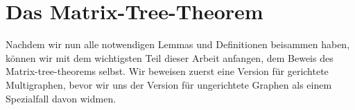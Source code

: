\graphicspath{{grafiken/}}

\section{Das Matrix-Tree-Theorem}

Nachdem wir nun alle notwendigen Lemmas und Definitionen beisammen haben, können wir mit dem wichtigsten Teil dieser Arbeit anfangen, dem Beweis des Matrix-tree-theorems selbst. Wir beweisen zuerst eine Version für gerichtete Multigraphen, bevor wir uns der Version für ungerichtete Graphen als einem Spezialfall davon widmen.



